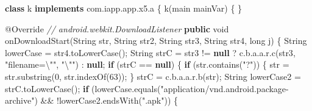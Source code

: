 \documentclass[
]{article}
\newenvironment{Shaded}{}{}
\newcommand{\AttributeTok}[1]{\textcolor[rgb]{0.49,0.56,0.16}{#1}}
\newcommand{\BuiltInTok}[1]{\textcolor[rgb]{0.00,0.50,0.00}{#1}}
\newcommand{\CommentTok}[1]{\textcolor[rgb]{0.38,0.63,0.69}{\textit{#1}}}
\newcommand{\ControlFlowTok}[1]{\textcolor[rgb]{0.00,0.44,0.13}{\textbf{#1}}}
\newcommand{\DataTypeTok}[1]{\textcolor[rgb]{0.56,0.13,0.00}{#1}}
\newcommand{\DecValTok}[1]{\textcolor[rgb]{0.25,0.63,0.44}{#1}}
\newcommand{\FunctionTok}[1]{\textcolor[rgb]{0.02,0.16,0.49}{#1}}
\newcommand{\KeywordTok}[1]{\textcolor[rgb]{0.00,0.44,0.13}{\textbf{#1}}}
\newcommand{\NormalTok}[1]{#1}
\newcommand{\OperatorTok}[1]{\textcolor[rgb]{0.40,0.40,0.40}{#1}}
\newcommand{\SpecialCharTok}[1]{\textcolor[rgb]{0.25,0.44,0.63}{#1}}
\newcommand{\StringTok}[1]{\textcolor[rgb]{0.25,0.44,0.63}{#1}}
\begin{document}
\begin{Shaded}
\begin{Highlighting}[]
    \KeywordTok{class}\NormalTok{ k }\KeywordTok{implements}\NormalTok{ com}\OperatorTok{.}\FunctionTok{iapp}\OperatorTok{.}\FunctionTok{app}\OperatorTok{.}\FunctionTok{x5}\OperatorTok{.}\FunctionTok{a} \OperatorTok{\{}
        \FunctionTok{k}\OperatorTok{(}\NormalTok{main mainVar}\OperatorTok{)} \OperatorTok{\{}
        \OperatorTok{\}}

        \AttributeTok{@Override} \CommentTok{// android.webkit.DownloadListener}
        \KeywordTok{public} \DataTypeTok{void} \FunctionTok{onDownloadStart}\OperatorTok{(}\BuiltInTok{String}\NormalTok{ str}\OperatorTok{,} \BuiltInTok{String}\NormalTok{ str2}\OperatorTok{,} \BuiltInTok{String}\NormalTok{ str3}\OperatorTok{,} \BuiltInTok{String}\NormalTok{ str4}\OperatorTok{,} \DataTypeTok{long}\NormalTok{ j}\OperatorTok{)} \OperatorTok{\{}
            \BuiltInTok{String}\NormalTok{ lowerCase }\OperatorTok{=}\NormalTok{ str4}\OperatorTok{.}\FunctionTok{toLowerCase}\OperatorTok{();}
            \BuiltInTok{String}\NormalTok{ strC }\OperatorTok{=}\NormalTok{ str3 }\OperatorTok{!=} \KeywordTok{null} \OperatorTok{?}\NormalTok{ c}\OperatorTok{.}\FunctionTok{b}\OperatorTok{.}\FunctionTok{a}\OperatorTok{.}\FunctionTok{a}\OperatorTok{.}\FunctionTok{r}\OperatorTok{.}\FunctionTok{c}\OperatorTok{(}\NormalTok{str3}\OperatorTok{,} \StringTok{"filename=}\SpecialCharTok{\textbackslash{}"}\StringTok{"}\OperatorTok{,} \StringTok{"}\SpecialCharTok{\textbackslash{}"}\StringTok{"}\OperatorTok{)} \OperatorTok{:} \KeywordTok{null}\OperatorTok{;}
            \ControlFlowTok{if} \OperatorTok{(}\NormalTok{strC }\OperatorTok{==} \KeywordTok{null}\OperatorTok{)} \OperatorTok{\{}
                \ControlFlowTok{if} \OperatorTok{(}\NormalTok{str}\OperatorTok{.}\FunctionTok{contains}\OperatorTok{(}\StringTok{"?"}\OperatorTok{))} \OperatorTok{\{}
\NormalTok{                    str }\OperatorTok{=}\NormalTok{ str}\OperatorTok{.}\FunctionTok{substring}\OperatorTok{(}\DecValTok{0}\OperatorTok{,}\NormalTok{ str}\OperatorTok{.}\FunctionTok{indexOf}\OperatorTok{(}\DecValTok{63}\OperatorTok{));}
                \OperatorTok{\}}
\NormalTok{                strC }\OperatorTok{=}\NormalTok{ c}\OperatorTok{.}\FunctionTok{b}\OperatorTok{.}\FunctionTok{a}\OperatorTok{.}\FunctionTok{a}\OperatorTok{.}\FunctionTok{r}\OperatorTok{.}\FunctionTok{b}\OperatorTok{(}\NormalTok{str}\OperatorTok{);}
                \BuiltInTok{String}\NormalTok{ lowerCase2 }\OperatorTok{=}\NormalTok{ strC}\OperatorTok{.}\FunctionTok{toLowerCase}\OperatorTok{();}
                \ControlFlowTok{if} \OperatorTok{(}\NormalTok{lowerCase}\OperatorTok{.}\FunctionTok{equals}\OperatorTok{(}\StringTok{"application/vnd.android.package{-}archive"}\OperatorTok{)} \OperatorTok{\&\&} \OperatorTok{!}\NormalTok{lowerCase2}\OperatorTok{.}\FunctionTok{endsWith}\OperatorTok{(}\StringTok{".apk"}\OperatorTok{))} \OperatorTok{\{}

\end{Highlighting}
\end{Shaded}
\end{document}
